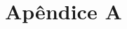 \documentclass[
	12pt,				%
	oneside,   	        %
	a4paper,			%
	english,			%
	french,				%
	spanish,			%
	brazil,				%
	]{pacotes/abntex2}
\begin{document}
\appendix
\chapter{Apêndice A}






\newpage


\postextual
\renewcommand{\bibsection}{%
\section{\bibname}
\bibmark
\prebibhook}


\end{document}
